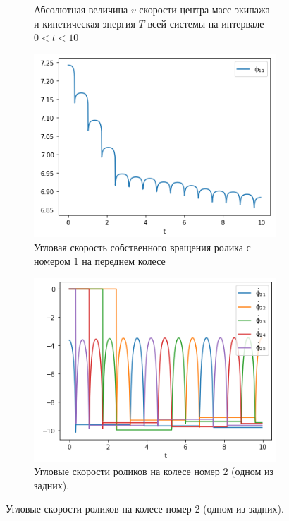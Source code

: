 \begin{figure}[htb]
\begin{subfigure}[t]{\textwidth}
            \caption{Абсолютная величина $v$ скорости центра масс экипажа и кинетическая энергия $T$ всей системы на интервале $0 < t < 10$}
            \label{fig:straight_Tv}
        \end{subfigure}
    \endminipage
    \quad
        \vspace{-20pt}
        \begin{subfigure}[t]{\textwidth}
            \centering
            \includegraphics[width=\linewidth]{content/pic/new/impact/impact_2_dphi_1.png}
            \vspace{-25pt}
            \caption{Угловая скорость собственного вращения ролика с номером $1$ на переднем колесе}
            \label{fig:straight_dphi_1}
        \end{subfigure}
        \begin{subfigure}[t]{\textwidth}
            \vspace{20pt}
            \centering
            \includegraphics[width=\linewidth]{content/pic/new/impact/impact_2_dphi_2.png}
            \vspace{-25pt}
            \caption{Угловые скорости роликов на колесе номер 2 (одном из задних).}
            \label{fig:straight_dphi_2}
        \end{subfigure}
    \endminipage


\end{figure}
